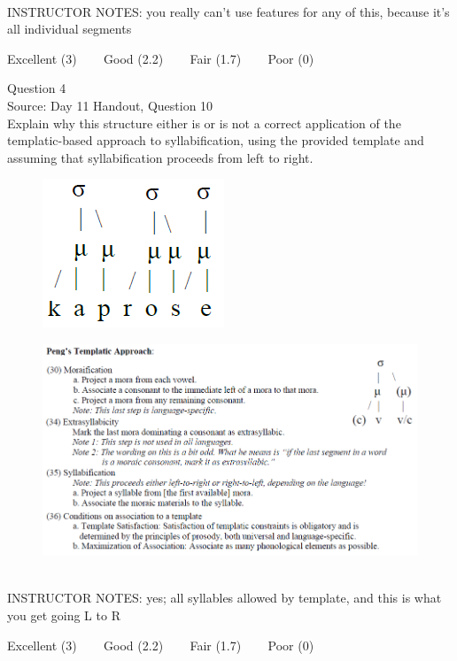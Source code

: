 \documentclass[12pt]{article}
\begin{document}
~\\
INSTRUCTOR NOTES: you really can't use features for any of this, because it's all individual segments


\vfill
Excellent (3) ~~~ Good (2.2) ~~~ Fair (1.7) ~~~ Poor (0)
\newpage

{\large Question 4}\\

Source: Day 11 Handout, Question 10\\

Explain why this structure either is or is not a correct application of the templatic-based approach to syllabification, using the provided template and assuming that syllabification proceeds from left to right.\\

\begin{figure}[H]
\includegraphics{../images/pengtemplate_kaprosse_yes.png}
\end{figure}
\begin{figure}[H]
\includegraphics{../images/peng_template_withdiagram.png}
\end{figure}

~\\
INSTRUCTOR NOTES: yes; all syllables allowed by template, and this is what you get going L to R


\vfill
Excellent (3) ~~~ Good (2.2) ~~~ Fair (1.7) ~~~ Poor (0)
\newpage
\end{document}
